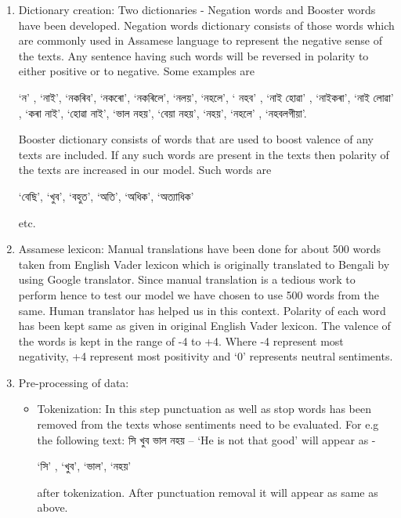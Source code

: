 \documentclass[conference]{IEEEtran}
\begin{document}
\begin{enumerate}
    \item  Dictionary creation: Two dictionaries - Negation words and Booster words have been developed. Negation words dictionary consists of those words which are commonly used in Assamese language to represent the negative sense of the texts. Any sentence having such words will be reversed in polarity to either positive or to negative. Some examples are 
    \begin{bengali}
    ‘ন’ , ‘নাই’, ‘নকৰিব’, ‘নকৰো’, ‘নকৰিলে’, ‘নলয়’, ‘নহলে’, ‘ নহব’ , ‘নাই হোৱা’ , ‘নাইকৰা’, ‘নাই লোৱা’ , ‘কৰা নাই’, ‘হোৱা নাই’,  ‘ভাল নহয়’,  ‘বেয়া নহয়’,  ‘নহয়’,  ‘নহলে’ , ‘নহবলগীয়া’.
    \end{bengali}

    Booster dictionary consists of words that are used to boost valence of any texts are included. If any such words are present in the texts then polarity of the texts are increased in our model.  Such words are
    \begin{bengali}
    ‘বেছি’, ‘খুব’, ‘বহুত’, ‘অতি’, ‘অধিক’, ‘অত্যাধিক’
    \end{bengali}etc.

    \item Assamese lexicon: Manual translations have been done for about 500 words taken from English Vader lexicon which is originally translated to Bengali by using Google translator. Since manual translation is a tedious work to perform hence to test our model we have chosen to use 500 words from the same. Human translator has helped us in this context. Polarity of each word has been kept same as given in original English Vader lexicon. The valence of the words is kept in the range of -4 to +4. Where -4 represent most negativity, +4 represent most positivity and ‘0’ represents neutral sentiments.
    
    \item Pre-processing of data:
            \begin{itemize}
                \item Tokenization: In this step punctuation as well as stop words has been removed from the texts whose sentiments need to be evaluated. For e.g the following text: সি খুব ভাল নহয় – ‘He is not that good’ will appear as - \begin{bengali} ‘সি’ , ‘খুব’,  ‘ভাল’,  ‘নহয়’ \end{bengali} after tokenization. After punctuation removal it will appear as same as above. 
                

\end{itemize}
\end{enumerate}
\end{document}
